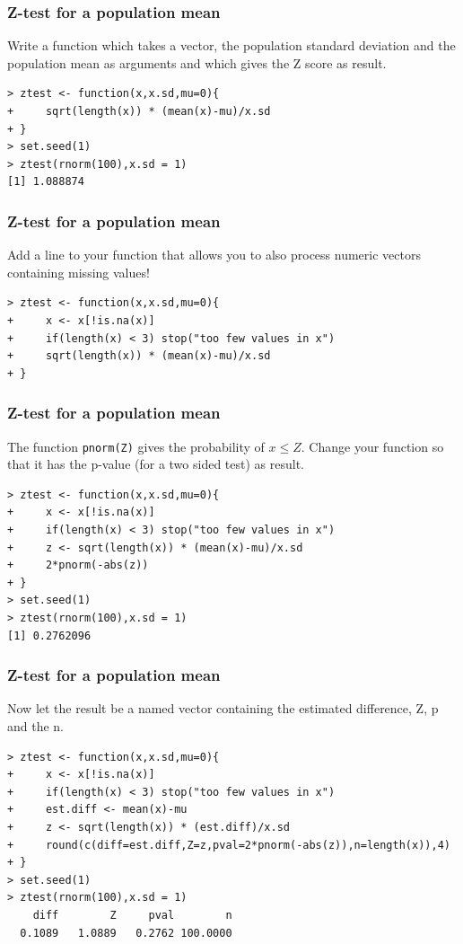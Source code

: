 \documentclass[xcolor={table}]{beamer}
\begin{document}
\begin{frame}[fragile]\frametitle{Z-test for a population mean}
Write a function which takes a vector, the population standard deviation and the population mean as arguments and which gives the Z score as result.
\begin{verbatim}
> ztest <- function(x,x.sd,mu=0){
+     sqrt(length(x)) * (mean(x)-mu)/x.sd
+ }
> set.seed(1)
> ztest(rnorm(100),x.sd = 1)
[1] 1.088874
\end{verbatim}
\end{frame}

\begin{frame}[fragile]\frametitle{Z-test for a population mean}
Add a line to your function that allows you to also process numeric vectors containing missing values!
\begin{verbatim}
> ztest <- function(x,x.sd,mu=0){
+     x <- x[!is.na(x)]
+     if(length(x) < 3) stop("too few values in x")
+     sqrt(length(x)) * (mean(x)-mu)/x.sd
+ }
\end{verbatim}
\end{frame}

\begin{frame}[fragile]\frametitle{Z-test for a population mean}
The function \texttt{pnorm(Z)} gives the probability of $x \leq Z $. Change your function so that it has the p-value (for a two sided test) as result. 
\begin{verbatim}
> ztest <- function(x,x.sd,mu=0){
+     x <- x[!is.na(x)]
+     if(length(x) < 3) stop("too few values in x")
+     z <- sqrt(length(x)) * (mean(x)-mu)/x.sd
+     2*pnorm(-abs(z))
+ }
> set.seed(1)
> ztest(rnorm(100),x.sd = 1)
[1] 0.2762096
\end{verbatim}
\end{frame}


\begin{frame}[fragile]\frametitle{Z-test for a population mean}
Now let the result be a named vector containing the estimated difference, Z, p and the n.
\footnotesize
\begin{verbatim}
> ztest <- function(x,x.sd,mu=0){
+     x <- x[!is.na(x)]
+     if(length(x) < 3) stop("too few values in x")
+     est.diff <- mean(x)-mu
+     z <- sqrt(length(x)) * (est.diff)/x.sd
+     round(c(diff=est.diff,Z=z,pval=2*pnorm(-abs(z)),n=length(x)),4)
+ }
> set.seed(1)
> ztest(rnorm(100),x.sd = 1)
    diff        Z     pval        n 
  0.1089   1.0889   0.2762 100.0000 

\end{verbatim}
\end{frame}
\end{document}
